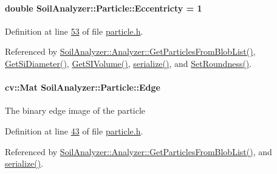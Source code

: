 \hypertarget{class_soil_analyzer_1_1_particle_afbcac116303747794d8e00b99364d2a4}{}
\paragraph[{Eccentricty}]{\setlength{\rightskip}{0pt plus 5cm}double Soil\+Analyzer\+::\+Particle\+::\+Eccentricty = 1}\label{class_soil_analyzer_1_1_particle_afbcac116303747794d8e00b99364d2a4}


Definition at line \hyperlink{particle_8h_source_l00053}{53} of file \hyperlink{particle_8h_source}{particle.\+h}.



Referenced by \hyperlink{analyzer_8cpp_source_l00322}{Soil\+Analyzer\+::\+Analyzer\+::\+Get\+Particles\+From\+Blob\+List()}, \hyperlink{particle_8cpp_source_l00068}{Get\+Si\+Diameter()}, \hyperlink{particle_8cpp_source_l00057}{Get\+S\+I\+Volume()}, \hyperlink{particle_8h_source_l00083}{serialize()}, and \hyperlink{particle_8cpp_source_l00089}{Set\+Roundness()}.

\hypertarget{class_soil_analyzer_1_1_particle_a0933445f172fb27b7bade9740938a2a5}{}
\paragraph[{Edge}]{\setlength{\rightskip}{0pt plus 5cm}cv\+::\+Mat Soil\+Analyzer\+::\+Particle\+::\+Edge}\label{class_soil_analyzer_1_1_particle_a0933445f172fb27b7bade9740938a2a5}
The binary edge image of the particle 

Definition at line \hyperlink{particle_8h_source_l00043}{43} of file \hyperlink{particle_8h_source}{particle.\+h}.



Referenced by \hyperlink{analyzer_8cpp_source_l00322}{Soil\+Analyzer\+::\+Analyzer\+::\+Get\+Particles\+From\+Blob\+List()}, and \hyperlink{particle_8h_source_l00083}{serialize()}.

\hypertarget{class_soil_analyzer_1_1_particle_ad953f0d8c12018f61cd957b28c1a56ae}{}
